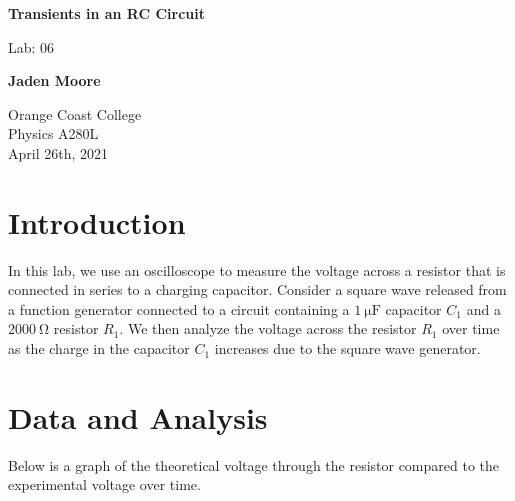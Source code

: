 \documentclass[12pt]{article}
\begin{document}

\begin{titlepage}
    \begin{center}
        \vspace*{1cm}
        \textbf{Transients in an RC Circuit}

        \vspace{0.5cm}
        Lab: 06

        \vspace{1cm}

        \textbf{Jaden Moore}

        \vfill

        Orange Coast College\\
        Physics A280L\\
        April 26th, 2021

    \end{center}
\end{titlepage}

\pagestyle{fancy}
\fancyhf{}
\setlength{\headheight}{15pt}
\cfoot{\thepage}

\section{Introduction}
In this lab, we use an oscilloscope to measure the voltage across a resistor that is connected in series to a charging capacitor. Consider a square wave released from a function generator connected to a circuit containing a $\SI{1}{\micro\farad}$ capacitor $C_1$ and a  $\SI{2000}{\ohm}$ resistor $R_1$. We then analyze the voltage across the resistor $R_1$ over time as the charge in the capacitor $C_1$ increases due to the square wave generator.

\section{Data and Analysis}
Below is a graph of the theoretical voltage through the resistor compared to the experimental voltage over time.
\end{document}

